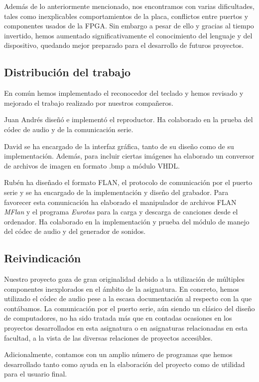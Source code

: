 \documentclass{article}
\begin{document}
Además de lo anteriormente mencionado, nos encontramos con varias dificultades, tales como inexplicables comportamientos de la placa, conflictos entre puertos y componentes usados de la FPGA.
Sin embargo a pesar de ello y gracias al tiempo invertido, hemos aumentado significativamente el conocimiento del lenguaje y del dispositivo, quedando mejor preparado para el desarrollo de futuros proyectos.

\subsection{Distribución del trabajo}
	En común hemos implementado el reconocedor del teclado y hemos revisado y mejorado el trabajo realizado por nuestros compañeros.

	\medskip Juan Andrés diseñó e implementó el reproductor. Ha colaborado en la prueba del códec de audio y de la comunicación serie.

	\medskip David se ha encargado de la interfaz gráfica, tanto de su diseño como de su implementación. Además, para incluir ciertas imágenes ha elaborado un conversor de archivos de imagen en formato .bmp a módulo VHDL.

	\medskip Rubén ha diseñado el formato FLAN, el protocolo de comunicación por el puerto serie y se ha encargado de la implementación y diseño del grabador. Para favorecer esta comunicación ha elaborado el manipulador de archivos FLAN {\itshape MFlan} y el programa {\itshape Eurotas} para la carga y descarga de canciones desde el ordenador. Ha colaborado en la implementación y prueba del módulo de manejo del códec de audio y del generador de sonidos.

\subsection{Reivindicación}
	Nuestro proyecto goza de gran originalidad debido a la utilización de múltiples componentes inexplorados en el ámbito de la asignatura. En concreto, hemos utilizado el códec de audio pese a la escasa documentación al respecto con la que contábamos. La comunicación por el puerto serie, aún siendo un clásico del diseño de computadores, no ha sido tratada más que en contadas ocasiones en los proyectos desarrollados en esta asignatura o en asignaturas relacionadas en esta facultad, a la vista de las diversas relaciones de proyectos accesibles.

	Adicionalmente, contamos con un amplio número de programas que hemos desarrollado tanto como ayuda en la elaboración del proyecto como de utilidad para el usuario final.
\end{document}
